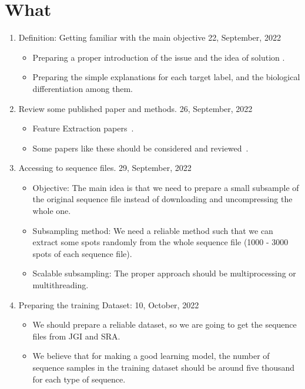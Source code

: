 \documentclass[a4paper]{article}
\newcommand{\deadline}[1]{{\color{blue} \hfill{#1} }}
\begin{document}
    \section{What}\label{sec:what}
    \begin{enumerate}
        \item Definition: Getting familiar with the main objective \deadline{22, September, 2022}
        \begin{itemize}
            \item Preparing a proper introduction of the issue and the idea of solution .
            \item Preparing the simple explanations for each target label, and the biological differentiation among them.
        \end{itemize}
        \item Review some published paper and methods. \deadline{26, September, 2022}
        \begin{itemize}
            \item Feature Extraction papers~\cite[]{RF103, RF101, RF104}.
            \item Some papers like these should be considered and reviewed~\cite[]{RF102, RF105}.
        \end{itemize}
        \item Accessing to sequence files.  \deadline{29, September, 2022}
        \begin{itemize}
            \item Objective: The main idea is that we need to prepare a small subsample of the original sequence file instead of downloading and uncompressing the whole one.
            \item Subsampling method: We need a reliable method such that we can extract some spots randomly from the whole sequence file (1000 - 3000 spots of each sequence file).
            \item Scalable subsampling: The proper approach should be multiprocessing or multithreading.
        \end{itemize}
        \item Preparing the training Dataset:\deadline{10, October, 2022}
        \begin{itemize}
            \item We should prepare a reliable dataset, so we are going to get the sequence files from JGI and SRA.\@
            \item We believe that for making a good learning model, the number of sequence samples in the training dataset should be around five thousand for each type of sequence.

\end{itemize}
\end{enumerate}
\end{document}
